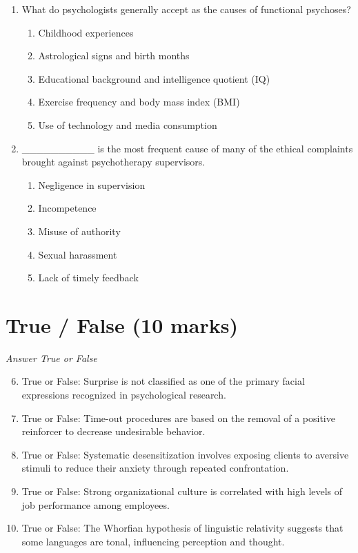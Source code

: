 \documentclass[12pt]{article}
\begin{document}
\begin{enumerate}[label=\arabic*.]
\begin{enumerate}[label=(\alph*)]
    \item Beck's cognitive-behavioral therapy.
    \item Pavlov's classical conditioning theory.
\end{enumerate}
\item What do psychologists generally accept as the causes of functional psychoses?
\begin{enumerate}[label=(\alph*)]
    \item Childhood experiences
    \item Astrological signs and birth months
    \item Educational background and intelligence quotient (IQ)
    \item Exercise frequency and body mass index (BMI)
    \item Use of technology and media consumption
\end{enumerate}
\item \_\_\_\_\_\_\_\_\_\_ is the most frequent cause of many of the ethical complaints brought against psychotherapy supervisors.
\begin{enumerate}[label=(\alph*)]
    \item Negligence in supervision
    \item Incompetence
    \item Misuse of authority
    \item Sexual harassment
    \item Lack of timely feedback
\end{enumerate}
\end{enumerate}

\section*{True / False (10 marks)}
\textit{Answer True or False}
\begin{enumerate}[label=\arabic*.]
\setcounter{enumi}{5}
\item True or False: Surprise is not classified as one of the primary facial expressions recognized in psychological research.
\item True or False: Time-out procedures are based on the removal of a positive reinforcer to decrease undesirable behavior.
\item True or False: Systematic desensitization involves exposing clients to aversive stimuli to reduce their anxiety through repeated confrontation.
\item True or False: Strong organizational culture is correlated with high levels of job performance among employees.
\item True or False: The Whorfian hypothesis of linguistic relativity suggests that some languages are tonal, influencing perception and thought.
\end{enumerate}
\end{document}
